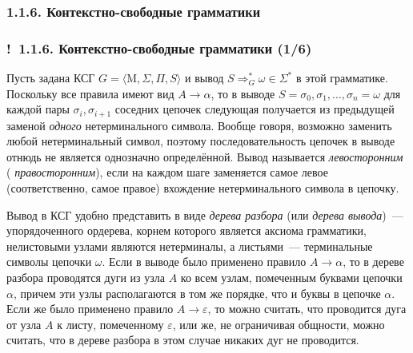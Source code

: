 \documentclass[mathserif,12pt,aspectratio=169]{beamer}
\def\emразделенной{\em разделенной}
\renewcommand{\index}[1]{}
\def\em#1{\it\color{blue}#1}
\def\odmkey#1#2{{\it\color{red} #1}\index{#2}}
\def\Ok{{\color{green}\textbf{!}\ }}
\begin{document}
\subsubsection{1.1.6. Контекстно-свободные грамматики}\label{1.1.6.}
\begin{frame}
\frametitle{\Ok 1.1.6. Контекстно-свободные грамматики (1/6)}

Пусть задана КСГ $G=\langle \mathrm{M}, \Sigma, \Pi, S\rangle$
и вывод $S\Rightarrow_G^*\omega \in \Sigma^*$
в этой грамматике. Поскольку все правила
имеют вид $A\rightarrow \alpha$, то в выводе
$S=\sigma_0,\sigma_1,\dots,\sigma_n=\omega$
для каждой пары $\sigma_i,\sigma_{i+1}$
соседних цепочек
следующая получается из предыдущей заменой
{\em одного} нетерминального символа.
Вообще говоря, возможно заменить
любой нетерминальный символ,
поэтому последовательность цепочек в выводе 
отнюдь не является однозначно определённой.
Вывод называется
\odmkey{левосторонним}{Вывод!левосторонний}
(\odmkey{правосторонним}{Вывод!правосторонний}),
если на каждом шаге заменяется самое левое
(соответственно, самое правое)
вхождение нетерминального символа в цепочку.

\smallskip
Вывод в КСГ
удобно представить в виде
\odmkey{дерева разбора}{Дерево!разбора}
(или \odmkey{дерева вывода}{Дерево!вывода})~---
упорядоченного ордерева,
корнем которого является аксиома грамматики,
нелистовыми узлами являются нетерминалы,
а листьями~--- терминальные символы цепочки $\omega$. 
Если в выводе было применено
правило  $A\rightarrow \alpha$, то в дереве разбора проводятся
дуги из узла $A$ ко всем узлам, помеченным буквами
цепочки $\alpha$, причем эти узлы располагаются
в том же порядке, что и буквы в цепочке $\alpha$.
Если же было применено правило 
$A\rightarrow \varepsilon$, то можно считать,
что проводится дуга от узла $A$ к листу, помеченному $\varepsilon$, 
или же, не ограничивая общности, можно считать, 
что в дереве разбора в этом случае никаких дуг не проводится. 
\end{frame}
\end{document}

